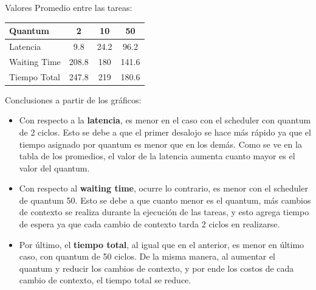 \begin{center}
Valores Promedio entre las tareas: \newline
\begin{tabular}{| l | c | c | c |}
\hline  
\textbf{Quantum} & \textbf{2} & \textbf{10} & \textbf{50} \\ \hline
Latencia & 9.8 & 24.2 & 96.2 \\ \hline
Waiting Time & 208.8 & 180 & 141.6 \\ \hline
Tiempo Total & 247.8 & 219 & 180.6 \\ \hline
\end{tabular}

\end{center}

\par Conclusiones a partir de los gráficos:

\begin{itemize}

\item Con respecto a la \textbf{latencia}, es menor en el caso con el scheduler con quantum de 2 ciclos. Esto se debe a que el primer desalojo se hace más rápido ya que el tiempo asignado por quantum es menor que en los demás. Como se ve en la tabla de los promedios, el valor de la latencia aumenta cuanto mayor es el valor del quantum.
\item Con respecto al \textbf{waiting time}, ocurre lo contrario, es menor con el scheduler de quantum 50. Esto se debe a que cuanto menor es el quantum, más cambios de contexto se realiza durante la ejecución de las tareas, y esto agrega tiempo de espera ya que cada cambio de contexto tarda 2 ciclos en realizarse.
\item Por último, el \textbf{tiempo total}, al igual que en el anterior, es menor en último caso, con quantum de 50 ciclos. De la misma manera, al aumentar el quantum y reducir los cambios de contexto, y por ende los costos de cada cambio de contexto, el tiempo total se reduce.
\end{itemize}



